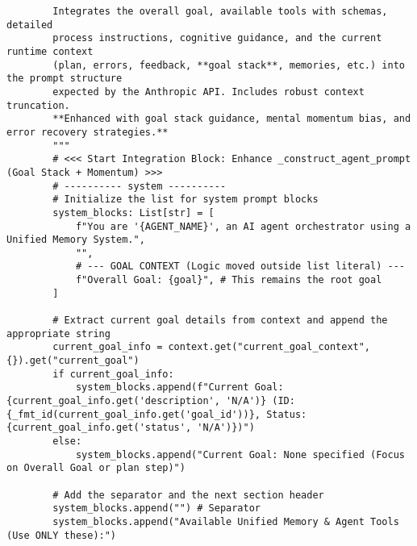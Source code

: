 \documentclass[12pt,a4paper]{article}
\begin{document}
\begin{pageablecode}
\begin{verbatim}
        Integrates the overall goal, available tools with schemas, detailed
        process instructions, cognitive guidance, and the current runtime context
        (plan, errors, feedback, **goal stack**, memories, etc.) into the prompt structure
        expected by the Anthropic API. Includes robust context truncation.
        **Enhanced with goal stack guidance, mental momentum bias, and error recovery strategies.**
        """
        # <<< Start Integration Block: Enhance _construct_agent_prompt (Goal Stack + Momentum) >>>
        # ---------- system ----------
        # Initialize the list for system prompt blocks
        system_blocks: List[str] = [
            f"You are '{AGENT_NAME}', an AI agent orchestrator using a Unified Memory System.",
            "",
            # --- GOAL CONTEXT (Logic moved outside list literal) ---
            f"Overall Goal: {goal}", # This remains the root goal
        ]

        # Extract current goal details from context and append the appropriate string
        current_goal_info = context.get("current_goal_context", {}).get("current_goal")
        if current_goal_info:
            system_blocks.append(f"Current Goal: {current_goal_info.get('description', 'N/A')} (ID: {_fmt_id(current_goal_info.get('goal_id'))}, Status: {current_goal_info.get('status', 'N/A')})")
        else:
            system_blocks.append("Current Goal: None specified (Focus on Overall Goal or plan step)")

        # Add the separator and the next section header
        system_blocks.append("") # Separator
        system_blocks.append("Available Unified Memory & Agent Tools (Use ONLY these):")


\end{verbatim}
\end{pageablecode}
\end{document}
